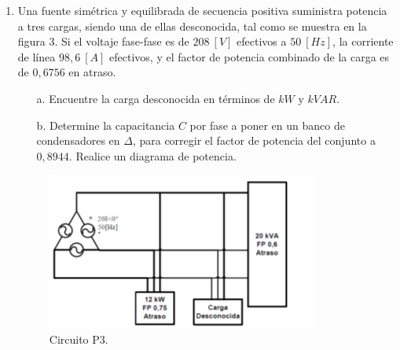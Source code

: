 \documentclass[
	spanish, %
	letterpaper, oneside
]{article}
\begin{document}
\begin{enumerate}
    \item Una fuente simétrica y equilibrada de secuencia positiva suministra potencia a tres cargas, siendo una de ellas desconocida, tal como se muestra en la figura 3. Si el voltaje fase-fase es de $208~[V]$ efectivos a $50~[Hz]$, la corriente de línea $98,6~[A]$ efectivos, y el factor de potencia combinado de la carga es de $0,6756$ en atraso.
\begin{enumerate}
    \item[a.] Encuentre la carga desconocida en términos de $kW$ y $kVAR$.
    \item[b.] Determine la capacitancia $C$ por fase a poner en un banco de condensadores en $\Delta$, para corregir el factor de potencia del conjunto a $0,8944$. Realice un diagrama de potencia.
\end{enumerate}
  \begin{figure}[h!]
        \centering
        \includegraphics[width=0.7\linewidth]{img/Examen_1_3.png}
        \caption{Circuito P3.}
        \label{fig:p3}
    \end{figure}
    \end{enumerate}
\end{document}
